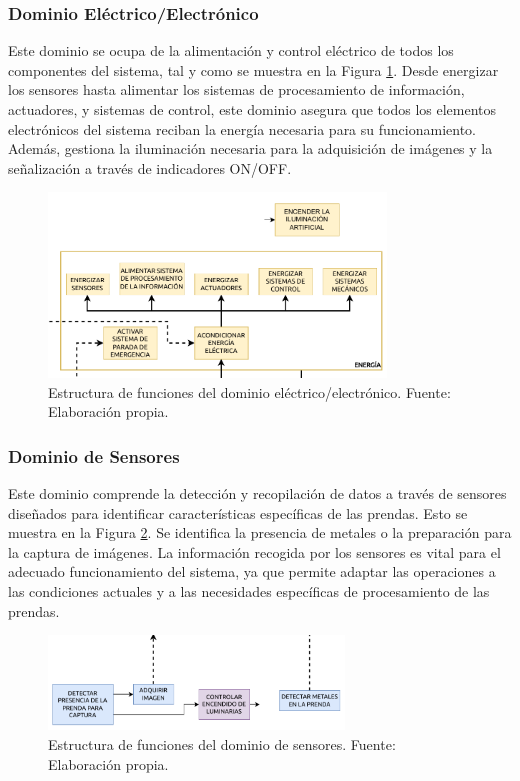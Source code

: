 \subsubsection{Dominio Eléctrico/Electrónico}

Este dominio se ocupa de la alimentación y control eléctrico de todos los componentes del sistema, tal y como se muestra en la Figura \ref{fig:EF_DEE}. Desde energizar los sensores hasta alimentar los sistemas de procesamiento de información, actuadores, y sistemas de control, este dominio asegura que todos los elementos electrónicos del sistema reciban la energía necesaria para su funcionamiento. Además, gestiona la iluminación necesaria para la adquisición de imágenes y la señalización a través de indicadores ON/OFF.

\begin{figure}[h]
	\centering
	\includegraphics[width=0.8\textwidth]{img/EF_DEE.pdf}
	\caption[Estructura de funciones del dominio eléctrico/electrónico.]{Estructura de funciones del dominio eléctrico/electrónico. Fuente: Elaboración propia.}
	\label{fig:EF_DEE}
\end{figure}

\subsubsection{Dominio de Sensores}

Este dominio comprende la detección y recopilación de datos a través de sensores diseñados para identificar características específicas de las prendas. Esto se muestra en la Figura \ref{fig:EF_DS}. Se identifica la presencia de metales o la preparación para la captura de imágenes. La información recogida por los sensores es vital para el adecuado funcionamiento del sistema, ya que permite adaptar las operaciones a las condiciones actuales y a las necesidades específicas de procesamiento de las prendas.

\begin{figure}[h]
	\centering
	\includegraphics[width=0.7\textwidth]{img/EF_DS.pdf}
	\caption[Estructura de funciones del dominio de sensores.]{Estructura de funciones del dominio de sensores. Fuente: Elaboración propia.}
	\label{fig:EF_DS}
\end{figure}

